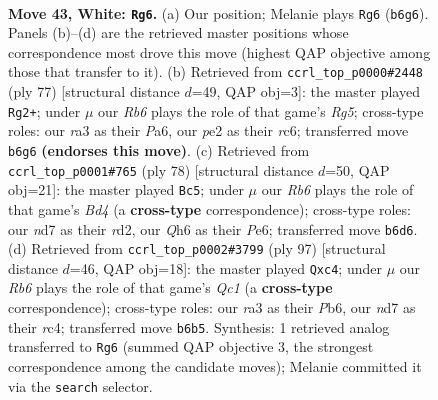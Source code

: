 \documentclass[11pt]{article}
\begin{document}
\clearpage

\begin{figure}[p]\centering
\begin{subfigure}{0.46\textwidth}\centering
\resizebox{\linewidth}{!}{%
\newchessgame
\chessboard[
  setfen={4b3/3n1k2/1R5Q/3P4/8/r5p1/P1P1p1P1/4K3 w - - 2 43},
  showmover=false,
  pgfstyle=straightmove, color=movearrow, markmove={b6-g6}
]}
\caption{}
\end{subfigure}\hfill
\begin{subfigure}{0.46\textwidth}\centering
\resizebox{\linewidth}{!}{%
\newchessgame
\chessboard[
  setfen={8/5kp1/p1R5/5p2/1P4r1/7p/P2B1K1P/8 b - - 0 39},
  showmover=false,
  pgfstyle=straightmove, color=movearrow, markmove={g4-g2}
]}
\caption{}
\end{subfigure}
\\[4pt]
\begin{subfigure}{0.46\textwidth}\centering
\resizebox{\linewidth}{!}{%
\newchessgame
\chessboard[
  setfen={8/4k2p/3bP1p1/6R1/3B4/6PP/3r4/7K w - - 2 40},
  showmover=false,
  pgfstyle=straightmove, color=movearrow, markmove={d4-c5}
]}
\caption{}
\end{subfigure}\hfill
\begin{subfigure}{0.46\textwidth}\centering
\resizebox{\linewidth}{!}{%
\newchessgame
\chessboard[
  setfen={2q5/p4p1P/1p1k4/4p1P1/2R1B3/6K1/5P2/8 b - - 0 49},
  showmover=false,
  pgfstyle=straightmove, color=movearrow, markmove={c8-c4}
]}
\caption{}
\end{subfigure}
\caption{\textbf{Move 43, White: \texttt{Rg6}.} (a) Our position; Melanie plays \texttt{Rg6} (\texttt{b6g6}). Panels (b)--(d) are the retrieved master positions whose correspondence most drove this move (highest QAP objective among those that transfer to it). (b) Retrieved from \texttt{ccrl\_top\_p0000\#2448} (ply 77) [structural distance $d$=49, QAP obj=3]: the master played \texttt{Rg2+}; under $\mu$ our \emph{Rb6} plays the role of that game's \emph{Rg5}; cross-type roles: our \emph{r}a3 as their \emph{P}a6, our \emph{p}e2 as their \emph{r}c6; transferred move \texttt{b6g6} \textbf{(endorses this move)}. (c) Retrieved from \texttt{ccrl\_top\_p0001\#765} (ply 78) [structural distance $d$=50, QAP obj=21]: the master played \texttt{Bc5}; under $\mu$ our \emph{Rb6} plays the role of that game's \emph{Bd4} (a \textbf{cross-type} correspondence); cross-type roles: our \emph{n}d7 as their \emph{r}d2, our \emph{Q}h6 as their \emph{P}e6; transferred move \texttt{b6d6}. (d) Retrieved from \texttt{ccrl\_top\_p0002\#3799} (ply 97) [structural distance $d$=46, QAP obj=18]: the master played \texttt{Qxc4}; under $\mu$ our \emph{Rb6} plays the role of that game's \emph{Qc1} (a \textbf{cross-type} correspondence); cross-type roles: our \emph{r}a3 as their \emph{P}b6, our \emph{n}d7 as their \emph{r}c4; transferred move \texttt{b6b5}. Synthesis: 1 retrieved analog transferred to \texttt{Rg6} (summed QAP objective 3, the strongest correspondence among the candidate moves); Melanie committed it via the \texttt{search} selector.}
\label{fig:thought-m84}
\end{figure}
\end{document}
